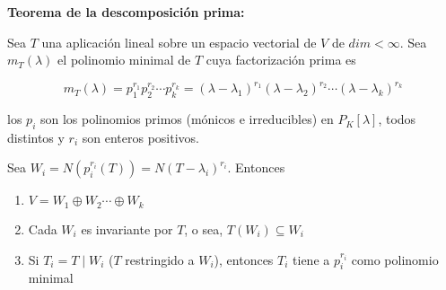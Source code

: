 \bigskip

\begin{corollary}\textbf{ Teorema de la descomposición prima:}

\bigskip

Sea $T$ una aplicación lineal sobre un espacio vectorial de $V$ de $dim<\infty$. Sea  $m_T(\lambda)$ el polinomio minimal de $T$ cuya factorización prima  es  

$$m_T(\lambda)=p_1^{r_1}p_2^{r_2}   \cdots p_k^{r_k}=(\lambda-\lambda_1)^{r_1} (\lambda-\lambda_2)^{r_2}\cdots(\lambda-\lambda_k)^{r_k}$$

\bigskip

\noindent
los $p_i$ son los polinomios primos (mónicos e irreducibles)  en $P_K\left[\lambda\right]$, todos distintos y $r_i$ son enteros positivos.





\bigskip

Sea $W_i=N(p_i^{r_i}(T))=N(T-\lambda_i)^{r_i}$. Entonces

\bigskip

\begin{enumerate}

\bigskip

\item $V=W_1 \oplus W_2\cdots  \oplus W_k$

\bigskip

\item
Cada $W_i$ es invariante por $T$, o sea,  $T(W_i)\subseteq W_i$

\bigskip

\item
Si $T_i=T \mid W_i$ ($T$ restringido a $W_i$), entonces $T_i$ tiene a $p_i^{r_i}$ como polinomio minimal

\end{enumerate}

\end{corollary} 


\bigskip


